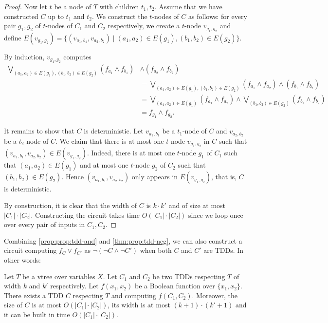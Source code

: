 \documentclass[a4paper,UKenglish,cleveref, autoref, thm-restate]{lipics-v2021}
\begin{document}
\begin{toappendix}
\begin{proof}
  Now let $t$ be a node of $T$ with children $t_1,t_2$. Assume that we have constructed $C$ up to $t_1$ and $t_2$. We construct the $t$-nodes of $C$ as follows: for every pair $g_1,g_2$ of $t$-nodes of $C_1$ and $C_2$ respectively, we create a $t$-node $v_{g_1,g_2}$ and define $E(v_{g_1,g_2}) = \{ (v_{a_1,b_1},v_{a_2,b_2}) \mid (a_1,a_2) \in E(g_1), (b_1,b_2) \in E(g_2) \}$.

  By induction, $v_{g_1,g_2}$ computes
  \begin{align*}
    \bigvee_{(a_1,a_2) \in E(g_1), (b_1,b_2) \in E(g_2)} (f_{a_1} \wedge f_{b_1}) & \wedge (f_{a_2} \wedge f_{b_2})   \\ & = \bigvee_{(a_1,a_2) \in E(g_1), (b_1,b_2) \in E(g_2)} (f_{a_1} \wedge f_{a_2}) \wedge (f_{b_1} \wedge f_{b_2}) \\
                                                                                  & = \bigvee_{(a_1,a_2) \in E(g_1)} (f_{a_1} \wedge f_{a_2}) \wedge \bigvee_{(b_1,b_2) \in E(g_2)} (f_{b_1} \wedge f_{b_2}) \\
    &= f_{g_1} \wedge f_{g_2}.
  \end{align*}

  It remains to show that $C$ is deterministic. Let $v_{a_1,b_1}$ be a $t_1$-node of $C$ and $v_{a_2,b_2}$ be a $t_2$-node of $C$. We claim that there is at most one $t$-node $v_{g_1,g_2}$  in $C$ such that $(v_{a_1,b_1}, v_{a_2,b_2}) \in E(v_{g_1,g_2})$. Indeed, there is at most one $t$-node $g_1$ of $C_1$ such that $(a_1,a_2) \in E(g_1)$ and at most one $t$-node $g_2$ of $C_2$ such that $(b_1,b_2) \in E(g_2)$. Hence $(v_{a_1,b_1}, v_{a_2,b_2})$ only appears in $E(v_{g_1,g_2})$, that is, $C$ is deterministic.

  By construction, it is clear that the width of $C$ is $k \cdot k'$ and of size at most $|C_1|\cdot|C_2|$. Constructing the circuit takes time $O(|C_1|\cdot|C_2|)$ since we loop once over every pair of inputs in $C_1, C_2$. 
\end{proof}

Combining \cref{prop:prop:tdd-and} and \cref{thm:prop:tdd-neg}, we can also construct a circuit computing $f_C \vee f_{C'}$ as $\neg (\neg C \wedge \neg C')$ when both $C$ and $C'$ are TDDs. In other words:

\begin{theorem}
  \label{thm:prop:tdd-apply} Let $T$ be a vtree over variables $X$. Let $C_1$ and $C_2$ be two TDDs respecting $T$ of width $k$ and $k'$ respectively. Let $f(x_1,x_2)$ be a Boolean function over $\{x_1,x_2\}$. There exists a TDD $C$ respecting $T$ and computing $f(C_1, C_2)$. Moreover, the size of $C$ is at most $O(|C_1| \cdot |C_2|)$, its width is at most $(k+1) \cdot (k'+1)$ and it can be built in time $O(|C_1| \cdot |C_2|)$.
\end{theorem}


\end{toappendix}
\end{document}

